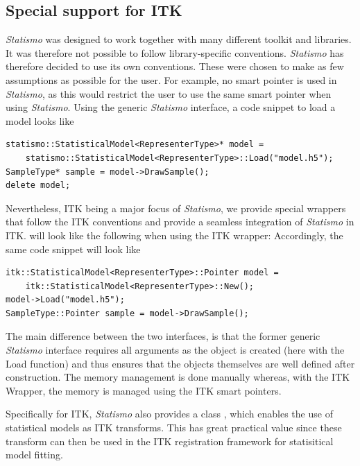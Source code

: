 \documentclass{InsightArticle}
\newcommand{\Statismo}{\emph{Statismo}\xspace}
\begin{document}
\subsection{Special support for ITK}
\Statismo was designed to work together with many different toolkit
and libraries. It was therefore not possible to follow library-specific
conventions. \Statismo has therefore decided to use its own conventions. These
were chosen to make as few assumptions as possible for the user. For example, no smart pointer is used in \Statismo, as
this would restrict the user to use the same smart pointer when using
\Statismo. Using the generic \Statismo interface, a code snippet to load a model looks like
\begin{verbatim}
statismo::StatisticalModel<RepresenterType>* model = 
    statismo::StatisticalModel<RepresenterType>::Load("model.h5");
SampleType* sample = model->DrawSample();
delete model;
\end{verbatim}
Nevertheless, ITK being a major focus of \Statismo, we
provide special wrappers that follow the ITK conventions and provide a seamless integration of  \Statismo in ITK. 
will look like the following when using the ITK wrapper:
Accordingly, the same code snippet will look like
\begin{verbatim}
itk::StatisticalModel<RepresenterType>::Pointer model = 
    itk::StatisticalModel<RepresenterType>::New();
model->Load("model.h5");
SampleType::Pointer sample = model->DrawSample();
\end{verbatim}
The main difference between the two interfaces, is that the former generic \Statismo interface
requires all arguments as the object is created
(here with the Load function) and thus ensures that 
the objects themselves are well defined after construction.
The memory management is done manually whereas, with the ITK Wrapper, the memory is managed using the ITK smart pointers. 

Specifically for ITK, \Statismo also provides a class , which 
enables the use of statistical models as ITK transforms. This has great practical value since these transform can then be used in the  ITK registration framework for statisitical model fitting. 
\end{document}
